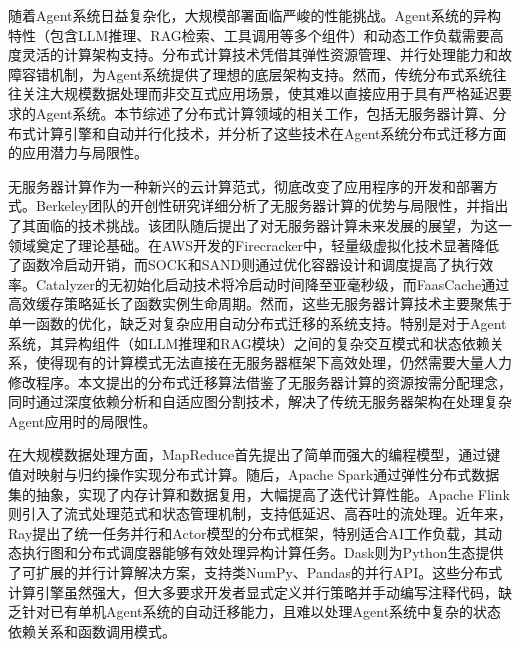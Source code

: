 随着Agent系统日益复杂化，大规模部署面临严峻的性能挑战。Agent系统的异构特性（包含LLM推理、RAG检索、工具调用等多个组件）和动态工作负载需要高度灵活的计算架构支持。分布式计算技术凭借其弹性资源管理、并行处理能力和故障容错机制，为Agent系统提供了理想的底层架构支持。然而，传统分布式系统往往关注大规模数据处理而非交互式应用场景，使其难以直接应用于具有严格延迟要求的Agent系统。本节综述了分布式计算领域的相关工作，包括无服务器计算、分布式计算引擎和自动并行化技术，并分析了这些技术在Agent系统分布式迁移方面的应用潜力与局限性。


无服务器计算作为一种新兴的云计算范式，彻底改变了应用程序的开发和部署方式。Berkeley团队的开创性研究\cite{jonas2019cloudprogrammingsimplifiedberkeley}详细分析了无服务器计算的优势与局限性，并指出了其面临的技术挑战。该团队随后提出了对无服务器计算未来发展的展望，为这一领域奠定了理论基础。在AWS开发的Firecracker\cite{246288}中，轻量级虚拟化技术显著降低了函数冷启动开销，而SOCK\cite{216031}和SAND\cite{215935}则通过优化容器设计和调度提高了执行效率。Catalyzer\cite{10.1145/3373376.3378512}的无初始化启动技术将冷启动时间降至亚毫秒级，而FaasCache\cite{10.1145/3445814.3446757}通过高效缓存策略延长了函数实例生命周期。然而，这些无服务器计算技术主要聚焦于单一函数的优化，缺乏对复杂应用自动分布式迁移的系统支持。特别是对于Agent系统，其异构组件（如LLM推理和RAG模块）之间的复杂交互模式和状态依赖关系，使得现有的计算模式无法直接在无服务器框架下高效处理，仍然需要大量人力修改程序。本文提出的分布式迁移算法借鉴了无服务器计算的资源按需分配理念，同时通过深度依赖分析和自适应图分割技术，解决了传统无服务器架构在处理复杂Agent应用时的局限性。

在大规模数据处理方面，MapReduce\cite{10.1145/1327452.1327492}首先提出了简单而强大的编程模型，通过键值对映射与归约操作实现分布式计算。随后，Apache Spark通过弹性分布式数据集\cite{10.5555/2228298.2228301}的抽象，实现了内存计算和数据复用，大幅提高了迭代计算性能。Apache Flink\cite{10.14778/3137765.3137777}则引入了流式处理范式和状态管理机制，支持低延迟、高吞吐的流处理。近年来，Ray\cite{10.5555/3291168.3291210}提出了统一任务并行和Actor模型的分布式框架，特别适合AI工作负载，其动态执行图和分布式调度器能够有效处理异构计算任务。Dask\cite{rocklin2015dask}则为Python生态提供了可扩展的并行计算解决方案，支持类NumPy、Pandas的并行API。这些分布式计算引擎虽然强大，但大多要求开发者显式定义并行策略并手动编写注释代码，缺乏针对已有单机Agent系统的自动迁移能力，且难以处理Agent系统中复杂的状态依赖关系和函数调用模式。

